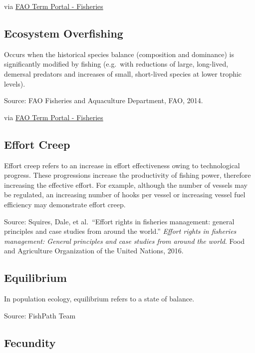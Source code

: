 \documentclass[
  11pt,
]{book}
\begin{document}
via \href{http://www.fao.org/fishery/glossary/en}{FAO Term Portal - Fisheries}

\hypertarget{ecosystem-overfishing}{%
\subsection{Ecosystem Overfishing}\label{ecosystem-overfishing}}

Occurs when the historical species balance (composition and dominance) is significantly modified by fishing (e.g.~with reductions of large, long-lived, demersal predators and increases of small, short-lived species at lower trophic levels).

Source: FAO Fisheries and Aquaculture Department, FAO, 2014.

via \href{http://www.fao.org/fishery/glossary/en}{FAO Term Portal - Fisheries}

\hypertarget{effort-creep}{%
\subsection{Effort Creep}\label{effort-creep}}

Effort creep refers to an increase in effort effectiveness owing to technological progress. These progressions increase the productivity of fishing power, therefore increasing the effective effort. For example, although the number of vessels may be regulated, an increasing number of hooks per vessel or increasing vessel fuel efficiency may demonstrate effort creep.

Source: Squires, Dale, et al.~``Effort rights in fisheries management: general principles and case studies from around the world.'' \emph{Effort rights in fisheries management: General principles and case studies from around the world}. Food and Agriculture Organization of the United Nations, 2016.

\hypertarget{equilibrium}{%
\subsection{Equilibrium}\label{equilibrium}}

In population ecology, equilibrium refers to a state of balance.

Source: FishPath Team

\hypertarget{fecundity}{%
\subsection{Fecundity}\label{fecundity}}
\end{document}
